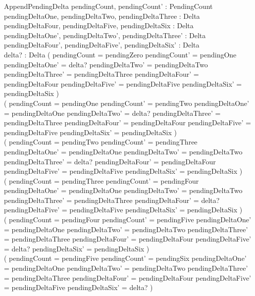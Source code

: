\documentclass{article}
\begin{document}
\begin{schema}{AppendPendingDelta}
	pendingCount, pendingCount' : PendingCount \\
	pendingDeltaOne, pendingDeltaTwo, pendingDeltaThree : Delta \\
	pendingDeltaFour, pendingDeltaFive, pendingDeltaSix : Delta \\
	pendingDeltaOne', pendingDeltaTwo', pendingDeltaThree' : Delta \\
	pendingDeltaFour', pendingDeltaFive', pendingDeltaSix' : Delta \\
	delta? : Delta
	\where
	( pendingCount = pendingZero \land pendingCount' = pendingOne \land
	pendingDeltaOne' = delta? \land pendingDeltaTwo' = pendingDeltaTwo \land
	pendingDeltaThree' = pendingDeltaThree \land pendingDeltaFour' = pendingDeltaFour \land
	pendingDeltaFive' = pendingDeltaFive \land pendingDeltaSix' = pendingDeltaSix ) \lor \\
	( pendingCount = pendingOne \land pendingCount' = pendingTwo \land
	pendingDeltaOne' = pendingDeltaOne \land pendingDeltaTwo' = delta? \land
	pendingDeltaThree' = pendingDeltaThree \land pendingDeltaFour' = pendingDeltaFour \land
	pendingDeltaFive' = pendingDeltaFive \land pendingDeltaSix' = pendingDeltaSix ) \lor \\
	( pendingCount = pendingTwo \land pendingCount' = pendingThree \land
	pendingDeltaOne' = pendingDeltaOne \land pendingDeltaTwo' = pendingDeltaTwo \land
	pendingDeltaThree' = delta? \land pendingDeltaFour' = pendingDeltaFour \land
	pendingDeltaFive' = pendingDeltaFive \land pendingDeltaSix' = pendingDeltaSix ) \lor \\
	( pendingCount = pendingThree \land pendingCount' = pendingFour \land
	pendingDeltaOne' = pendingDeltaOne \land pendingDeltaTwo' = pendingDeltaTwo \land
	pendingDeltaThree' = pendingDeltaThree \land pendingDeltaFour' = delta? \land
	pendingDeltaFive' = pendingDeltaFive \land pendingDeltaSix' = pendingDeltaSix ) \lor \\
	( pendingCount = pendingFour \land pendingCount' = pendingFive \land
	pendingDeltaOne' = pendingDeltaOne \land pendingDeltaTwo' = pendingDeltaTwo \land
	pendingDeltaThree' = pendingDeltaThree \land pendingDeltaFour' = pendingDeltaFour \land
	pendingDeltaFive' = delta? \land pendingDeltaSix' = pendingDeltaSix ) \lor \\
	( pendingCount = pendingFive \land pendingCount' = pendingSix \land
	pendingDeltaOne' = pendingDeltaOne \land pendingDeltaTwo' = pendingDeltaTwo \land
	pendingDeltaThree' = pendingDeltaThree \land pendingDeltaFour' = pendingDeltaFour \land
	pendingDeltaFive' = pendingDeltaFive \land pendingDeltaSix' = delta? )
\end{schema}
\end{document}
